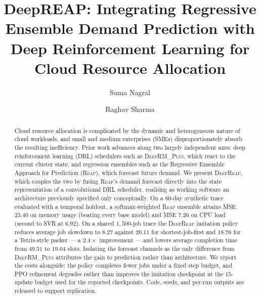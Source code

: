 \documentclass[runningheads]{llncs}
\newcommand{\reap}{\textsc{Reap}}
\newcommand{\deeprm}{\textsc{DeepRM\_Plus}}
\newcommand{\deepreap}{\textsc{DeepReap}}
\begin{document}
\title{DeepREAP: Integrating Regressive Ensemble Demand Prediction with Deep Reinforcement Learning for Cloud Resource Allocation}

\author{Suma Nagral \and Raghav Sharma}


\maketitle

\begin{abstract}
Cloud resource allocation is complicated by the dynamic and
heterogeneous nature of cloud workloads, and small and medium
enterprises (SMEs) disproportionately absorb the resulting
inefficiency. Prior work advances along two largely independent axes:
deep reinforcement learning (DRL) schedulers such as \deeprm{}, which
react to the current cluster state, and regression ensembles such as
the Regressive Ensemble Approach for Prediction (\reap{}), which
forecast future demand. We present \deepreap{}, which couples the two
by fusing \reap{}'s demand forecast directly into the state
representation of a convolutional DRL scheduler, realising as working
software an architecture previously specified only conceptually. On a
60-day synthetic trace evaluated with a temporal holdout, a
softmax-weighted \reap{} ensemble attains MSE $23.40$ on memory usage
(beating every base model) and MSE $7.26$ on CPU load (second to SVR at
$6.92$). On a shared $1{,}500$-job trace the \deepreap{} imitation
policy reduces average job slowdown to $8.27$ against $20.11$ for
shortest-job-first and $18.76$ for a Tetris-style packer --- a
$2.4\times$ improvement --- and lowers average completion time from
$49.51$ to $19.04$ slots. Isolating the forecast channels as the only
difference from \deeprm{} attributes the gain to prediction rather than
architecture. We report the costs alongside: the policy completes fewer
jobs under a fixed step budget, and PPO refinement degrades rather than
improves the imitation checkpoint at the $15$-update budget used for the
reported checkpoints. Code, seeds, and per-run outputs are released to
support replication.
\end{abstract}
\end{document}
